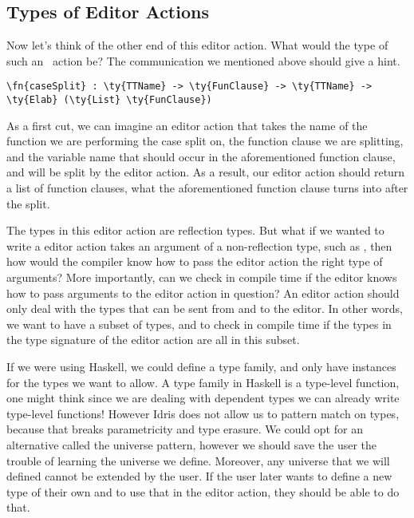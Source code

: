 \subsection{Types of Editor Actions}\label{ssec:types}

Now let's think of the other end of this editor action. What would the type of
such an \Elab\ action be? The communication we mentioned above should give a hint.

\begin{Verbatim}[framesep=2mm, label=\footnotesize{\normalfont{Idris}}, labelposition=topline]
\fn{caseSplit} : \ty{TTName} -> \ty{FunClause} -> \ty{TTName} -> \ty{Elab} (\ty{List} \ty{FunClause})
\end{Verbatim}

As a first cut, we can imagine an editor action that takes the name of the function
we are performing the case split on, the function clause we are splitting,
and the variable name that should occur in the aforementioned function clause,
and will be split by the editor action. As a result, our editor action should return
a list of function clauses, what the aforementioned function clause turns into
after the split.


The types in this editor action are reflection types.  But what if we wanted to write
a editor action takes an argument of a non-reflection type, such as , then
how would the compiler know how to pass the editor action the right type of arguments?
More importantly, can we check in compile time if the editor knows how to pass
arguments to the editor action in question? An editor action should only deal
with the types that can be sent from and to the editor.
In other words, we want to have a subset of types, and to check in compile time
if the types in the type signature of the editor action are all in this subset.

If we were using Haskell, we could define a type family, and only have instances
for the types we want to allow. A type family in Haskell is a type-level
function, one might think since we are dealing with dependent types we can
already write type-level functions! However Idris does not allow us to pattern
match on types, because that breaks parametricity and type erasure.\cite{universePat}
We could opt for an alternative called the universe pattern, however we should
save the user the trouble of learning the universe we define. Moreover, any
universe that we will defined cannot be extended by the user. If the user later
wants to define a new type of their own and to use that in the editor action,
they should be able to do that.

